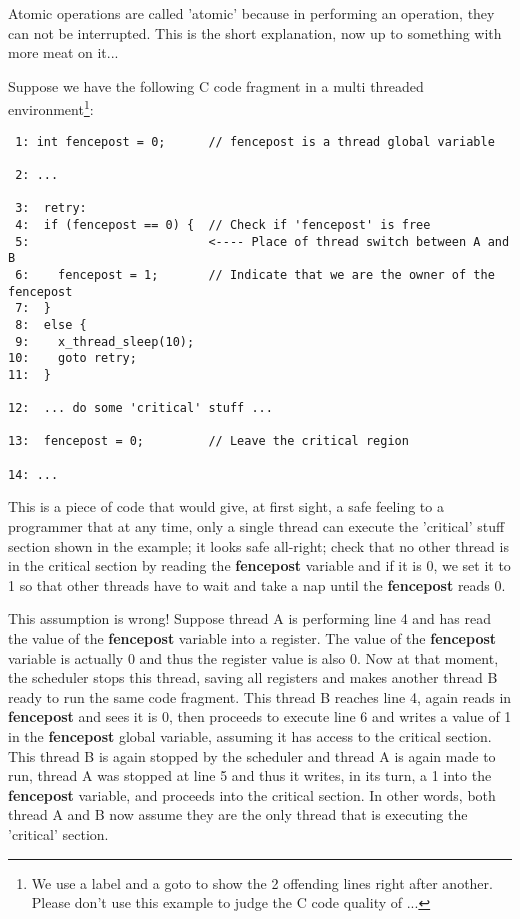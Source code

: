 Atomic operations are called 'atomic' because in performing an operation,
they can not be interrupted. This is the short explanation, now up to
something with more meat on it...

Suppose we have the following C code fragment
in a multi threaded environment\footnote{We use a label and a goto to show
the 2 offending lines right after another. Please don't use this example to
judge the C code quality of \oswald...}:

\bcode
\begin{verbatim}
 1: int fencepost = 0;      // fencepost is a thread global variable

 2: ...

 3:  retry:
 4:  if (fencepost == 0) {  // Check if 'fencepost' is free
 5:                         <---- Place of thread switch between A and B
 6:    fencepost = 1;       // Indicate that we are the owner of the fencepost
 7:  }
 8:  else {
 9:    x_thread_sleep(10);
10:    goto retry;
11:  }

12:  ... do some 'critical' stuff ...

13:  fencepost = 0;         // Leave the critical region

14: ...

\end{verbatim}
\ecode


This is a piece of code that would give, at first sight, a safe feeling to a
programmer that at any time, only a single thread can execute the 'critical' stuff
section shown in the example; it looks safe all-right; check that no other
thread is in the critical section by reading the \textbf{fencepost} variable and if
it is 0, we set it to 1 so that other threads have to wait and take a nap
until the \textbf{fencepost} reads 0.

This assumption is wrong! Suppose thread A is performing line 4 and has read
the value of the \textbf{fencepost} variable into a register. The value of
the \textbf{fencepost} variable is actually 0 and thus the register value is
also 0. Now at that moment, the scheduler stops this thread, saving all
registers and makes another thread B ready to run the same code fragment. This
thread B reaches line 4, again reads in \textbf{fencepost} and sees it is 0,
then proceeds to execute line 6 and writes a value of 1 in the
\textbf{fencepost} global variable, assuming it has access to the critical
section. This thread B is again stopped by the
scheduler and thread A is again made to run, thread A was stopped at line 5
and thus it writes, in its turn, a 1 into the \textbf{fencepost} variable,
and proceeds into the critical section. In
other words, both thread A and B now assume they are the only thread that is
executing the 'critical' section.

